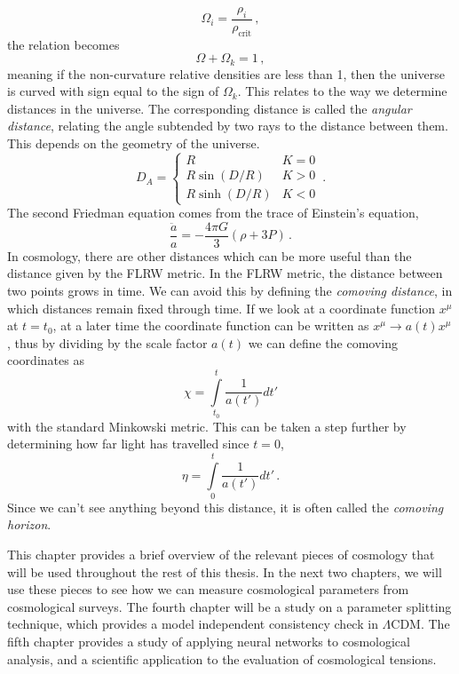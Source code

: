 \begin{equation}
    \Omega_i = \frac{\rho_i}{\rho_\mathrm{crit}}\,,
\end{equation}
the relation becomes
\begin{equation}
    \Omega + \Omega_k = 1 \,,
\end{equation}
meaning if the non-curvature relative densities are less than 1, then the universe is curved with sign equal to the sign of $\Omega_k$. This relates to the way we determine distances in the universe. The corresponding distance is called the \textit{angular distance}, relating the angle subtended by two rays to the distance between them. This depends on the geometry of the universe.
\begin{equation}
    D_A = \left\{ \begin{array}{cc}
        R & K=0 \\
        R\sin(D/R) & K>0 \\
        R\sinh(D/R) & K<0
    \end{array}
    \right.\,.
\end{equation}
The second Friedman equation comes from the trace of Einstein's equation,
\begin{equation}
    \frac{\ddot a}{a} = -\frac{4\pi G}{3}(\rho + 3P)\,.
\end{equation}
In cosmology, there are other distances which can be more useful than the distance given by the FLRW metric. In the FLRW metric, the distance between two points grows in time. 
We can avoid this by defining the \textit{comoving distance}, in which distances remain fixed through time. 
If we look at a coordinate function $x^\mu$ at $t=t_0$, at a later time the coordinate function can be written as $x^\mu \rightarrow a(t) x^\mu$, thus by dividing by the scale factor $a(t)$ we can define the comoving coordinates as
\begin{equation}
    \chi = \int\limits^{t}_{t_0} \frac{1}{a(t')} dt'
\end{equation}
with the standard Minkowski metric. This can be taken a step further by determining how far light has travelled since $t=0$,
\begin{equation}
    \eta = \int\limits^t_0 \frac{1}{a(t')}dt'\,.
\end{equation}
Since we can't see anything beyond this distance, it is often called the \textit{comoving horizon}. 

This chapter provides a brief overview of the relevant pieces of cosmology that will be used throughout the rest of this thesis. In the next two chapters, we will use these pieces to see how we can measure cosmological parameters from cosmological surveys. The fourth chapter will be a study on a parameter splitting technique, which provides a model independent consistency check in $\Lambda$CDM. The fifth chapter provides a study of applying neural networks to cosmological analysis, and a scientific application to the evaluation of cosmological tensions.